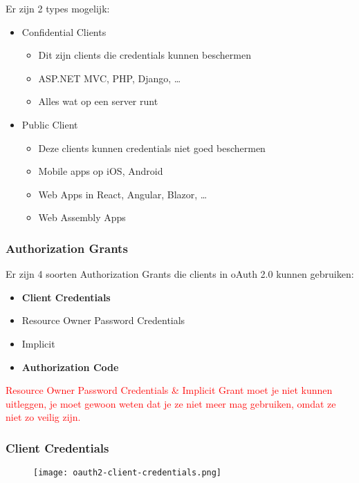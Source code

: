 \documentclass{article}
\begin{document}
Er zijn 2 types mogelijk:

\begin{itemize}
    \item Confidential Clients
    \begin{itemize}
        \item Dit zijn clients die credentials kunnen beschermen
        \item ASP.NET MVC, PHP, Django, \dots
        \item Alles wat op een server runt
    \end{itemize}
    \item Public Client
    \begin{itemize}
        \item Deze clients kunnen credentials niet goed beschermen
        \item Mobile apps op iOS, Android
        \item Web Apps in React, Angular, Blazor, \dots
        \item Web Assembly Apps
    \end{itemize}
\end{itemize}

\subsubsection{Authorization Grants}

Er zijn 4 soorten Authorization Grants die clients in oAuth 2.0 kunnen gebruiken:

\begin{itemize}
    \item \textbf{Client Credentials}   
    \item Resource Owner Password Credentials
    \item Implicit
    \item \textbf{Authorization Code}
\end{itemize}

\textcolor{red}{Resource Owner Password Credentials \& Implicit Grant moet je niet kunnen uitleggen,
je moet gewoon weten dat je ze niet meer mag gebruiken, omdat ze niet zo veilig zijn.}

\subsubsection{Client Credentials}

\begin{figure}[H]
    \centering
    \texttt{[image: oauth2-client-credentials.png]}
\end{figure}
\end{document}
